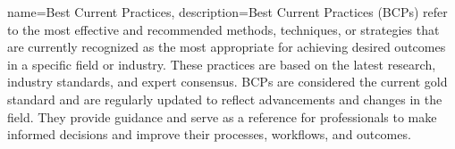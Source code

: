 \usepackage[toc]{glossaries}
\glsdisablehyper %
\makeglossaries


{
    name={Best Current Practices},
    description={Best Current Practices (BCPs) refer to the most effective and recommended methods, techniques, or strategies that are currently recognized as the most appropriate for achieving desired outcomes in a specific field or industry. These practices are based on the latest research, industry standards, and expert consensus. BCPs are considered the current gold standard and are regularly updated to reflect advancements and changes in the field. They provide guidance and serve as a reference for professionals to make informed decisions and improve their processes, workflows, and outcomes.}
}
